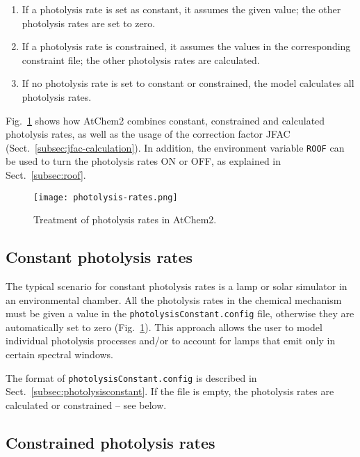 \begin{enumerate}
\item If a photolysis rate is set as constant, it assumes the given
  value; the other photolysis rates are set to zero.
\item If a photolysis rate is constrained, it assumes the values in
  the corresponding constraint file; the other photolysis rates are
  calculated.
\item If no photolysis rate is set to constant or constrained, the
  model calculates all photolysis rates.
\end{enumerate}

Fig.~\ref{fig:photol} shows how AtChem2 combines constant,
constrained and calculated photolysis rates, as well as the usage of
the correction factor JFAC (Sect.~\ref{subsec:jfac-calculation}). In
addition, the environment variable \texttt{ROOF} can be used to turn
the photolysis rates ON or OFF, as explained in Sect.~\ref{subsec:roof}.

\begin{figure}[htb]
  \centering
  \texttt{[image: photolysis-rates.png]}
  \caption{Treatment of photolysis rates in AtChem2.}
  \label{fig:photol}
\end{figure}

\subsection{Constant photolysis rates} \label{subsec:constant-photolysis-rates}

The typical scenario for constant photolysis rates is a lamp or solar
simulator in an environmental chamber. All the photolysis rates in the
chemical mechanism must be given a value in the
\texttt{photolysisConstant.config} file, otherwise they are
automatically set to zero (Fig.~\ref{fig:photol}).  This approach
allows the user to model individual photolysis processes and/or to
account for lamps that emit only in certain spectral windows.

The format of \texttt{photolysisConstant.config} is described in
Sect.~\ref{subsec:photolysisconstant}. If the file is empty, the
photolysis rates are calculated or constrained -- see below.

\subsection{Constrained photolysis rates} \label{subsec:constrained-photolysis-rates}

